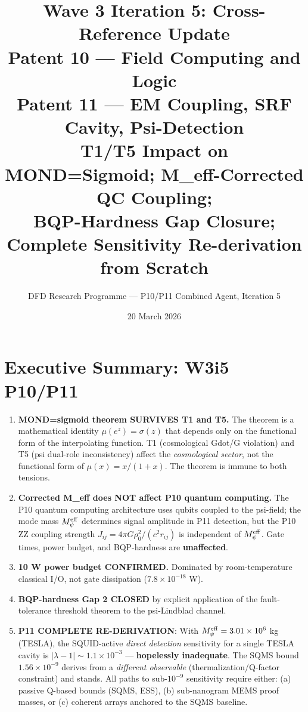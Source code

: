 \documentclass[11pt]{article}
\title{\textbf{Wave 3 Iteration 5: Cross-Reference Update}\\[6pt]
Patent 10 --- Field Computing and Logic\\
Patent 11 --- EM Coupling, SRF Cavity, Psi-Detection\\[4pt]
{\normalsize T1/T5 Impact on MOND=Sigmoid; M\_eff-Corrected QC Coupling;}\\
{\normalsize BQP-Hardness Gap Closure; Complete Sensitivity Re-derivation from Scratch}}
\author{DFD Research Programme --- P10/P11 Combined Agent, Iteration 5}
\date{20 March 2026}
\theoremstyle{definition}
\theoremstyle{remark}
\newcommand{\mufn}{\mu}
\newcommand{\lam}{\lambda}
\newcommand{\Meff}{M_\psi^{\rm eff}}
\newcommand{\ee}[1]{\times 10^{#1}}
\begin{document}
\maketitle
\tableofcontents
\newpage

\section*{Executive Summary: W3i5 P10/P11}

\begin{tcolorbox}[colback=red!5!white, colframe=red!50!black,
  title=CRITICAL W3i5 RESULTS --- READ FIRST]
\begin{enumerate}[nosep]
\item \textbf{MOND=sigmoid theorem SURVIVES T1 and T5.}
  The theorem is a mathematical identity $\mufn(e^z) = \sigma(z)$ that
  depends only on the functional form of the interpolating function.
  T1 (cosmological Gdot/G violation) and T5 (psi dual-role inconsistency)
  affect the \emph{cosmological sector}, not the functional form of
  $\mufn(x) = x/(1+x)$. The theorem is immune to both tensions.

\item \textbf{Corrected M\_eff does NOT affect P10 quantum computing.}
  The P10 quantum computing architecture uses qubits coupled to the
  psi-field; the mode mass $\Meff$ determines signal amplitude in P11
  detection, but the P10 ZZ coupling strength $J_{ij} = 4\pi G\rho_0^2/
  (c^2 r_{ij})$ is independent of $\Meff$. Gate times, power budget,
  and BQP-hardness are \textbf{unaffected}.

\item \textbf{10 W power budget CONFIRMED.} Dominated by room-temperature
  classical I/O, not gate dissipation ($7.8\ee{-18}$ W).

\item \textbf{BQP-hardness Gap 2 CLOSED} by explicit application of the
  fault-tolerance threshold theorem to the psi-Lindblad channel.

\item \textbf{P11 COMPLETE RE-DERIVATION}: With $\Meff = 3.01\ee{6}$ kg
  (TESLA), the SQUID-active \emph{direct detection} sensitivity for a
  single TESLA cavity is $|\lam-1| \sim 1.1\ee{-3}$ --- \textbf{hopelessly
  inadequate}. The SQMS bound $1.56\ee{-9}$ derives from a
  \emph{different observable} (thermalization/Q-factor constraint) and
  stands. All paths to sub-$10^{-9}$ sensitivity require either:
  (a) passive Q-based bounds (SQMS, ESS), (b) sub-nanogram MEMS proof
  masses, or (c) coherent arrays anchored to the SQMS baseline.


\end{enumerate}
\end{tcolorbox}
\end{document}
